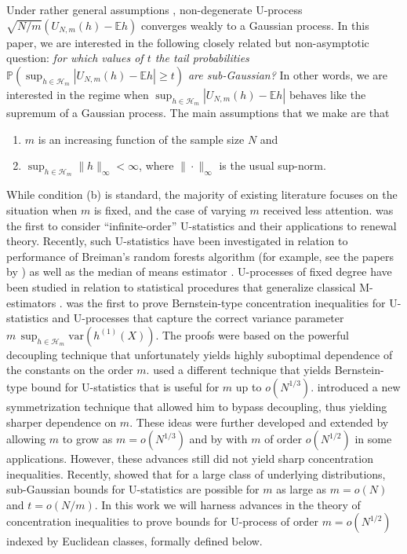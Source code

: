 \documentclass[12pt]{article}
\newcommand\var{\mathrm{var}}
\def\l{\left}
\def\r{\right}
\newcommand{\m}{\mathcal}
\newcommand{\mb}{\mathbb}
\newcommand{\pr}[1]{\mathbb{P}{\left(#1\right)}}
\theoremstyle{thmstyletwo}%
\theoremstyle{thmstylethree}%
\begin{document}
Under rather general assumptions \cite[e.g. see][chapter 5]{de2012decoupling}, non-degenerate U-process $\sqrt{N/m}(U_{N,m}(h) - \mb Eh)$ converges weakly to a Gaussian process. In this paper, we are interested in the following closely related but non-asymptotic question: \emph{for which values of $t$ the tail probabilities $\pr{\sup_{h\in \m H_m}\l| U_{N,m}(h) - \mb Eh\r|\geq t}$ are sub-Gaussian?} In other words, we are interested in the regime when 
$\sup_{h\in \m H_m}\l| U_{N,m}(h) - \mb Eh\r|$ behaves like the supremum of a Gaussian process. 
The main assumptions that we make are that 
\begin{enumerate}
\item[(a)] $m$ is an increasing function of the sample size $N$ and
\item[(b)] $\sup_{h\in \m H_m} \|h\|_\infty<\infty$, where $\|\cdot\|_\infty$ is the usual sup-norm.
\end{enumerate}
While condition (b) is standard, the majority of existing literature focuses on the situation when $m$ is fixed, and the case of varying $m$ received less attention. \citet{frees1989infinite} was the first to consider ``infinite-order'' U-statistics and their applications to renewal theory. Recently, such U-statistics have been investigated in relation to performance of Breiman's random forests algorithm (for example, see the papers by \citet{song2019approximating,peng2022rates,mentch2016quantifying}) as well as the median of means estimator \citep{minsker2023u}. 
U-processes of fixed degree have been studied in relation to statistical procedures that generalize classical M-estimators \citep{arcones1993limit,brunel2025asymptotics}. \citet{arcones1995bernstein} was the first to prove Bernstein-type concentration inequalities for U-statistics and U-processes that capture the correct variance parameter $m\,\sup_{h\in \m H_m}\var\l(h^{(1)}(X)\r)$. The proofs were based on the powerful decoupling technique \citep{de2012decoupling} that unfortunately yields highly suboptimal dependence of the constants on the order $m$.  \cite{maurer2019bernstein} used a different technique that yields Bernstein-type bound for U-statistics that is useful for $m$ up to $o(N^{1/3})$.
\cite{sherman1994maximal} introduced a new symmetrization technique that allowed him to bypass decoupling, thus yielding sharper dependence on $m$. These ideas were further developed and extended by \citet{heilig2001limit} allowing $m$ to grow as $m=o(N^{1/3})$ and by \citet{song2019approximating} with $m$ of order $o(N^{1/2})$ in some applications. However, these advances still did not yield sharp concentration inequalities. Recently, \citet{minsker2023u} showed that for a large class of underlying distributions, sub-Gaussian bounds for U-statistics are possible for $m$ as large as $m=o(N)$ and $t = o(N/m)$. 
In this work we will harness advances in the theory of concentration inequalities to prove bounds for U-process of order $m=o\l(N^{1/2}\r)$ indexed by Euclidean classes, formally defined below. 
\end{document}
